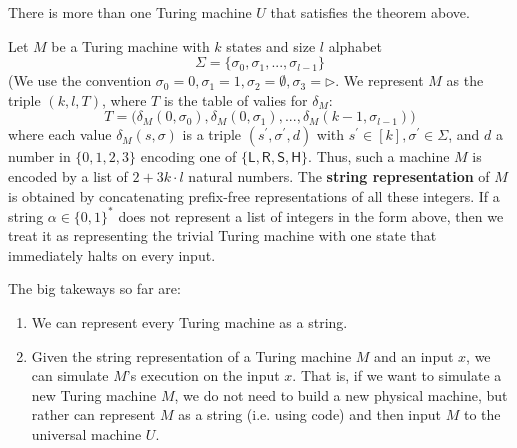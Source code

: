   There is more than one Turing machine $U$ that satisfies the theorem above. 

  \begin{definition}
  Let $M$ be a Turing machine with $k$ states and size $l$ alphabet
  \[\Sigma = \{\sigma_0, \sigma_1, ..., \sigma_{l-1}\}\]
  (We use the convention $\sigma_0 = 0, \sigma_1 = 1, \sigma_2 = \emptyset, \sigma_3 = \triangleright$. We represent $M$ as the triple $(k, l, T)$, where $T$ is the table of valies for $\delta_M$: 
  \[T = \big(\delta_M (0, \sigma_0), \delta_M (0, \sigma_1), ..., \delta_M (k-1, \sigma_{l-1})\big)\]
  where each value $\delta_M (s, \sigma)$ is a triple $(s^\prime, \sigma^\prime, d)$ with $s^\prime \in [k], \sigma^\prime \in \Sigma$, and $d$ a number in $\{0,1,2,3\}$ encoding one of $\{\mathsf{L, R, S, H}\}$. Thus, such a machine $M$ is encoded by a list of $2 + 3k \cdot l$ natural numbers. The \textbf{string representation} of $M$ is obtained by concatenating prefix-free representations of all these integers. If a string $\alpha \in \{0,1\}^*$ does not represent a list of integers in the form above, then we treat it as representing the trivial Turing machine with one state that immediately halts on every input. 
  \end{definition}
  The big takeways so far are: 
  \begin{enumerate}
      \item We can represent every Turing machine as a string. 
      \item Given the string representation of a Turing machine $M$ and an input $x$, we can simulate $M$'s execution on the input $x$. That is, if we want to simulate a new Turing machine $M$, we do not need to build a new physical machine, but rather can represent $M$ as a string (i.e. using code) and then input $M$ to the universal machine $U$. 
  \end{enumerate}


